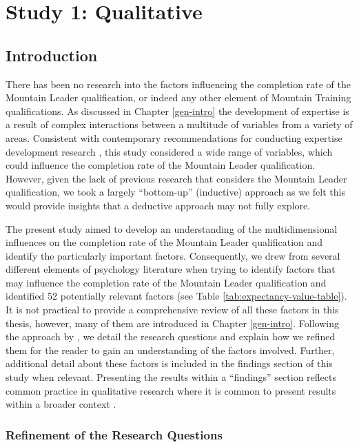 \documentclass[
  12pt,
  a4paper,
]{book}
\begin{document}
\hypertarget{ml-qualitative}{%
\chapter{Study 1: Qualitative}\label{ml-qualitative}}

\hypertarget{introduction}{%
\section{Introduction}\label{introduction}}

There has been no research into the factors influencing the completion rate of the Mountain Leader qualification, or indeed any other element of Mountain Training qualifications. As discussed in Chapter \ref{gen-intro} the development of expertise is a result of complex interactions between a multitude of variables from a variety of areas. Consistent with contemporary recommendations for conducting expertise development research \citep[e.g.,][]{Gullich2019, Jones2019a, Rees2016}, this study considered a wide range of variables, which could influence the completion rate of the Mountain Leader qualification. However, given the lack of previous research that considers the Mountain Leader qualification, we took a largely ``bottom-up'' (inductive) approach as we felt this would provide insights that a deductive approach may not fully explore.

The present study aimed to develop an understanding of the multidimensional influences on the completion rate of the Mountain Leader qualification and identify the particularly important factors. Consequently, we drew from several different elements of psychology literature when trying to identify factors that may influence the completion rate of the Mountain Leader qualification and identified 52 potentially relevant factors (see Table \ref{tab:expectancy-value-table}). It is not practical to provide a comprehensive review of all these factors in this thesis, however, many of them are introduced in Chapter \ref{gen-intro}. Following the approach by \citet{Hardy2017}, we detail the research questions and explain how we refined them for the reader to gain an understanding of the factors involved. Further, additional detail about these factors is included in the findings section of this study when relevant. Presenting the results within a ``findings'' section reflects common practice in qualitative research where it is common to present results within a broader context \citep{APA2020}.

\hypertarget{refinement-of-the-research-questions}{%
\subsection{Refinement of the Research Questions}\label{refinement-of-the-research-questions}}
\end{document}
